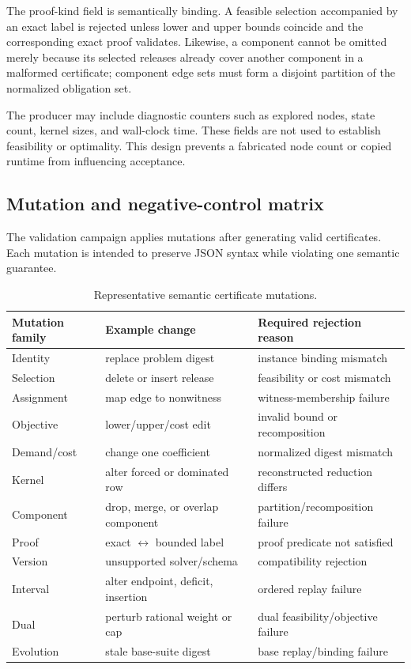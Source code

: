 \documentclass[10pt,conference]{IEEEtran}
\newcommand{\suppTableFont}{\footnotesize}
\begin{document}
The proof-kind field is semantically binding. A feasible selection accompanied by an exact label is rejected unless lower and upper bounds coincide and the corresponding exact proof validates. Likewise, a component cannot be omitted merely because its selected releases already cover another component in a malformed certificate; component edge sets must form a disjoint partition of the normalized obligation set.

The producer may include diagnostic counters such as explored nodes, state count, kernel sizes, and wall-clock time. These fields are not used to establish feasibility or optimality. This design prevents a fabricated node count or copied runtime from influencing acceptance.

\subsection{Mutation and negative-control matrix}
The validation campaign applies mutations after generating valid certificates. Each mutation is intended to preserve JSON syntax while violating one semantic guarantee.

\begin{table}[t]
\centering
\caption{Representative semantic certificate mutations.}
\suppTableFont
\begin{tabularx}{\columnwidth}{p{1.7cm}p{1.95cm}X}
\toprule
Mutation family & Example change & Required rejection reason \\
\midrule
Identity & replace problem digest & instance binding mismatch \\
Selection & delete or insert release & feasibility or cost mismatch \\
Assignment & map edge to nonwitness & witness-membership failure \\
Objective & lower/upper/cost edit & invalid bound or recomposition \\
Demand/cost & change one coefficient & normalized digest mismatch \\
Kernel & alter forced or dominated row & reconstructed reduction differs \\
Component & drop, merge, or overlap component & partition/recomposition failure \\
Proof & exact $\leftrightarrow$ bounded label & proof predicate not satisfied \\
Version & unsupported solver/schema & compatibility rejection \\
Interval & alter endpoint, deficit, insertion & ordered replay failure \\
Dual & perturb rational weight or cap & dual feasibility/objective failure \\
Evolution & stale base-suite digest & base replay/binding failure \\
\bottomrule
\end{tabularx}
\end{table}
\end{document}
